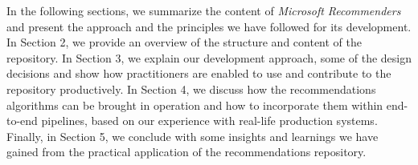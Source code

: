 In the following sections, we summarize the content of {\em Microsoft Recommenders} and present the approach and the principles we have followed
for its development. In Section 2, we provide an overview of the structure and content of the repository. In Section 3, we explain our development approach, some of
the design decisions and show how practitioners are enabled to use and contribute to the repository productively. In Section 4, we discuss how the recommendations
algorithms can be brought in operation and how to incorporate them within end-to-end pipelines, based on our experience with real-life production systems. 
Finally, in Section 5, we conclude with some insights and learnings we have gained from the practical application of the recommendations repository.


